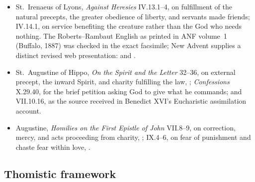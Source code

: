 {\fontsize{8.6}{9.6}\selectfont
\begin{itemize}[itemsep=0pt,parsep=0pt,topsep=0.05em]
\item St.~Irenaeus of Lyons, \emph{Against Heresies} IV.13.1--4, on fulfillment of the natural precepts, the greater obedience of liberty, and servants made friends; IV.14.1, on service benefiting the creature rather than the God who needs nothing. The Roberts--Rambaut English as printed in ANF volume~1 (Buffalo, 1887) was checked in the exact facsimile; New Advent supplies a distinct revised web presentation:  and .
\item St.~Augustine of Hippo, \emph{On the Spirit and the Letter} 32--36, on external precept, the inward Spirit, and charity fulfilling the law, ; \emph{Confessions} X.29.40, for the brief petition asking God to give what he commands; and VII.10.16, as the source received in Benedict XVI's Eucharistic assimilation account.
\item Augustine, \emph{Homilies on the First Epistle of John} VII.8--9, on correction, mercy, and acts proceeding from charity, ; IX.4--6, on fear of punishment and chaste fear within love, .
\end{itemize}}

\subsection*{Thomistic framework}

